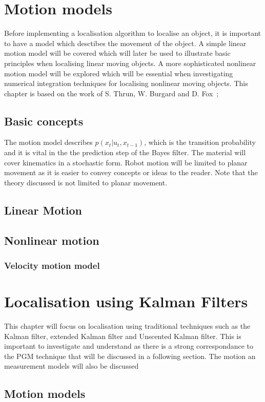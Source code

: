 \documentclass[12pt,oneside,openany,a4paper, %
afrikaans,english,
]{memoir}
\numberwithin{equation}{chapter}
\begin{document}
\chapter{Motion models}
Before implementing a localisation algorithm to localise an object, it is important to have a model which desctibes the movement of the object. A simple linear motion model will be covered which will later be used to illustrate basic principles when localising linear moving objects. A more sophisticated nonlinear motion model will be explored which will be essential when investigating numerical integration techniques for localising nonlinear moving objects. This chapter is based on the work of S. Thrun, W. Burgard and D. Fox~\citep{thrun};
\section{Basic concepts}
The motion model describes $p(x_t|u_t,x_{t-1})$, which is the transition probability and it is vital in the the prediction step of the Bayes filter. The material will cover kinematics in a stochastic form. Robot motion will be limited to planar movement as it is easier to convey concepts or ideas to the reader. Note that the theory discussed is not limited to planar movement.  
\section{Linear Motion}

\section{Nonlinear motion}
\subsection{Velocity motion model}
\chapter{Localisation using Kalman Filters}
This chapter will focus on localisation using traditional techniques such as the Kalman filter, extended Kalman filter and Unscented Kalman filter. This is important to investigate and understand as there is a strong correspondance to the PGM technique that will be discussed in a following section. The motion an measurement models will also be discussed 
\section{Motion models}
\end{document}
